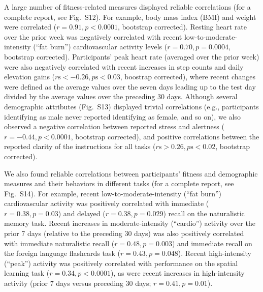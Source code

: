 \documentclass[10pt]{article}
\newcommand{\fitFitCorr}{S12}
\newcommand{\demDemCorr}{S13}
\newcommand{\allCorr}{S14}
\begin{document}
A large number of fitness-related measures displayed reliable
correlations (for a complete report, see Fig.~\fitFitCorr).  For
example, body mass index (BMI) and weight were correlated
($r = 0.91, p < 0.0001$, bootstrap corrected).  Resting heart rate over
the prior week was negatively correlated with recent
low-to-moderate-intensity (``fat burn'') cardiovascular
activity levels ($r = 0.70, p = 0.0004$, bootstrap corrected).
Participants' peak heart rate (averaged over the prior week) were also
negatively correlated with recent increases in step counts and daily
elevation gains ($r\mathrm{s} < -0.26, p\mathrm{s} < 0.03$, boostrap
corrected), where recent changes were defined as the average values
over the seven days leading up to the test day divided by the average
values over the preceding 30 days.  Although several demographic
attributes (Fig.~\demDemCorr) displayed trivial correlations (e.g.,
participants identifying as male never reported identifying as female,
and so on), we also observed a negative correlation between reported
stress and alertness ($r = -0.44, p < 0.0001$, bootstrap corrected), and
positive correlations between the reported clarity of the instructions for all
tasks ($r\mathrm{s} > 0.26, p\mathrm{s} < 0.02$, bootstrap corrected).

We also found reliable correlations between participants' fitness and
demographic measures and their behaviors in different tasks
(for a complete report, see Fig.~\allCorr).  For example, recent
low-to-moderate-intensity (``fat burn'') 
cardiovascular activity was positively
correlated with immediate ($r = 0.38, p = 0.03$) and delayed ($r =
0.38, p = 0.029$) recall on the naturalistic
memory task.  Recent increases in moderate-intensity (``cardio'')
activity over the prior 7 days (relative to the preceding 30 days) was
also positively correlated with immediate naturalistic recall ($r =
0.48, p = 0.003$) and immediate recall on the foreign language
flashcards task ($r = 0.43, p = 0.048$).  Recent high-intensity
(``peak'') activity was positively correlated with performance on the
spatial learning task ($r = 0.34, p < 0.0001$), as were recent increases
in high-intensity activity (prior 7 days versus preceding 30 days; $r
= 0.41, p = 0.01$).
\end{document}
